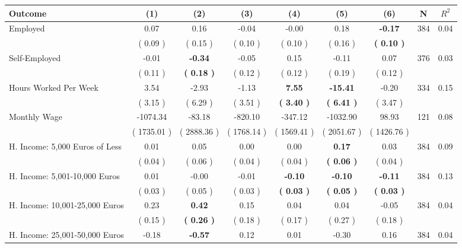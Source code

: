 \begin{tabular}{lcccccccc}
\toprule
 \textbf{Outcome} & \textbf{(1)} & \textbf{(2)} & \textbf{(3)} & \textbf{(4)} & \textbf{(5)} & \textbf{(6)} & \textbf{N} & \textbf{$ R^2$} \\
\midrule
Employed &      0.07 &      0.16 &     -0.04 &     -0.00 &      0.18 & \textbf{    -0.17} & 384 &       0.04 \\ 
 & (     0.09 ) & (     0.15 ) & (     0.10 ) & (     0.10 ) & (     0.16 ) & \textbf{(     0.10 )} & \\
Self-Employed &     -0.01 & \textbf{    -0.34} &     -0.05 &      0.15 &     -0.11 &      0.07 & 376 &       0.03 \\ 
 & (     0.11 ) & \textbf{(     0.18 )} & (     0.12 ) & (     0.12 ) & (     0.19 ) & (     0.12 ) & \\
Hours Worked Per Week &      3.54 &     -2.93 &     -1.13 & \textbf{     7.55} & \textbf{   -15.41} &     -0.20 & 334 &       0.15 \\ 
 & (     3.15 ) & (     6.29 ) & (     3.51 ) & \textbf{(     3.40 )} & \textbf{(     6.41 )} & (     3.47 ) & \\
Monthly Wage &  -1074.34 &    -83.18 &   -820.10 &   -347.12 &  -1032.90 &     98.93 & 121 &       0.08 \\ 
 & (  1735.01 ) & (  2888.36 ) & (  1768.14 ) & (  1569.41 ) & (  2051.67 ) & (  1426.76 ) & \\
H. Income: 5,000 Euros of Less &      0.01 &      0.05 &      0.00 &      0.00 & \textbf{     0.17} &      0.03 & 384 &       0.09 \\ 
 & (     0.04 ) & (     0.06 ) & (     0.04 ) & (     0.04 ) & \textbf{(     0.06 )} & (     0.04 ) & \\
H. Income: 5,001-10,000 Euros &      0.01 &     -0.00 &     -0.01 & \textbf{    -0.10} & \textbf{    -0.10} & \textbf{    -0.11} & 384 &       0.13 \\ 
 & (     0.03 ) & (     0.05 ) & (     0.03 ) & \textbf{(     0.03 )} & \textbf{(     0.05 )} & \textbf{(     0.03 )} & \\
H. Income: 10,001-25,000 Euros &      0.23 & \textbf{     0.42} &      0.15 &      0.04 &      0.04 &     -0.05 & 384 &       0.04 \\ 
 & (     0.15 ) & \textbf{(     0.26 )} & (     0.18 ) & (     0.17 ) & (     0.27 ) & (     0.18 ) & \\
H. Income: 25,001-50,000 Euros &     -0.18 & \textbf{    -0.57} &      0.12 &      0.01 &     -0.30 &      0.16 & 384 &       0.04 \\ 

\end{tabular}
